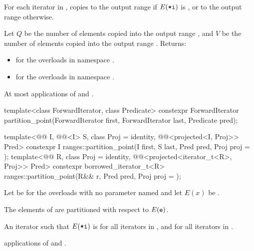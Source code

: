 \begin{itemdescr}
\pnum
\effects
For each iterator  in ,
copies  to the output range 
if $E(\tcode{*i})$ is , or
to the output range  otherwise.

\pnum
\returns
Let $Q$ be the number of elements copied
into the output range ,
and $V$ be the number of elements copied
into the output range .
Returns:
\begin{itemize}
\item {} for the overloads in namespace .
\item {} for the overloads in namespace .
\end{itemize}

\pnum
\complexity
At most  applications of  and .
\end{itemdescr}

%
\begin{itemdecl}
template<class ForwardIterator, class Predicate>
  constexpr ForwardIterator
    partition_point(ForwardIterator first, ForwardIterator last, Predicate pred);

template<@@ I, @@<I> S, class Proj = identity,
         @@<projected<I, Proj>> Pred>
  constexpr I ranges::partition_point(I first, S last, Pred pred, Proj proj = {});
template<@@ R, class Proj = identity,
         @@<projected<iterator_t<R>, Proj>> Pred>
  constexpr borrowed_iterator_t<R>
    ranges::partition_point(R&& r, Pred pred, Proj proj = {});
\end{itemdecl}

\begin{itemdescr}
\pnum
Let  be 
for the overloads with no parameter named 
and let $E(x)$ be .

\pnum
\expects
The elements  of 
are partitioned with respect to $E(\tcode{e})$.

\pnum
\returns
An iterator 
such that $E(\tcode{*i})$ is 
for all iterators  in , and
 for all iterators  in .

\pnum
\complexity
{} applications
of  and .
\end{itemdescr}

